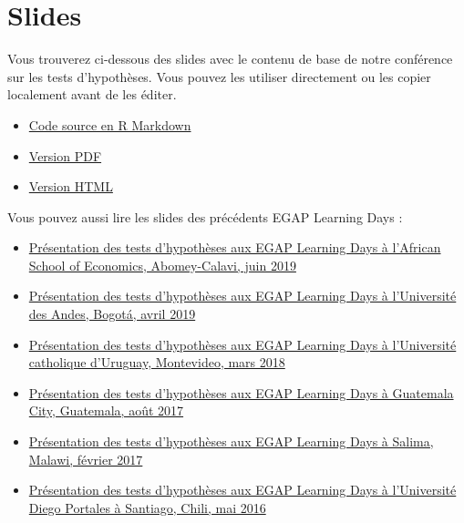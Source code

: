 \documentclass[
  12pt,
]{book}
\begin{document}
\hypertarget{slides-3}{%
\section{Slides}\label{slides-3}}

Vous trouverez ci-dessous des slides avec le contenu de base de notre conférence sur les tests d'hypothèses. Vous pouvez les utiliser directement ou les copier localement avant de les éditer.

\begin{itemize}
\item
  \href{https://egap.github.io/learningdays-resources/Slides/hypothesistesting-slides.Rmd}{Code source en R Markdown}
\item
  \href{https://egap.github.io/learningdays-resources/Slides/hypothesistesting-slides.pdf}{Version PDF}
\item
  \href{https://egap.github.io/learningdays-resources/Slides/hypothesistesting-slides.html}{Version HTML}
\end{itemize}

Vous pouvez aussi lire les slides des précédents EGAP Learning Days :

\begin{itemize}
\item
  \href{https://egap.github.io/learningdays-resources/Slides/Examples/hypothesistesting-benin.pdf}{Présentation des tests d'hypothèses aux EGAP Learning Days à l'African School of Economics, Abomey-Calavi, juin 2019}
\item
  \href{https://egap.github.io/learningdays-resources/Slides/Examples/hypothesistesting-bogota.pdf}{Présentation des tests d'hypothèses aux EGAP Learning Days à l'Université des Andes, Bogotá, avril 2019}
\item
  \href{https://egap.github.io/learningdays-resources/Slides/Examples/hypothesistesting-montevideo.pdf}{Présentation des tests d'hypothèses aux EGAP Learning Days à l'Université catholique d'Uruguay, Montevideo, mars 2018}
\item
  \href{https://egap.github.io/learningdays-resources/Slides/Examples/hypothesistesting-guatemala.pdf}{Présentation des tests d'hypothèses aux EGAP Learning Days à Guatemala City, Guatemala, août 2017}
\item
  \href{https://egap.github.io/learningdays-resources/Slides/Examples/hypothesistesting-malawi.pdf}{Présentation des tests d'hypothèses aux EGAP Learning Days à Salima, Malawi, février 2017}
\item
  \href{https://egap.github.io/learningdays-resources/Slides/Examples/hypothesistesting-santiago.pdf}{Présentation des tests d'hypothèses aux EGAP Learning Days à l'Université Diego Portales à Santiago, Chili, mai 2016}
\end{itemize}
\end{document}
